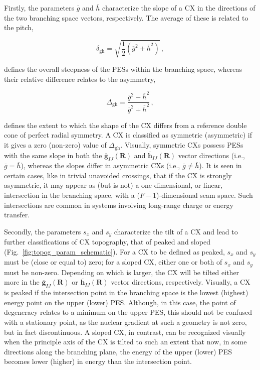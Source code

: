 \documentclass[9pt,bestpractices,pubversion]{livecoms}
\newcommand{\R}{\mathbf{R}}
\newcommand{\gua}[2]{\overline{\mathbf{g}}_{#1#2}(\R)}
\newcommand{\hua}[2]{\overline{\mathbf{h}}_{#1#2}(\R)}
\begin{document}
Firstly, the parameters $\overline{g}$ and $\overline{h}$ characterize the slope of a CX in the directions of the two branching space vectors, respectively.\cite{yarkony_nuclear_2001}
The average of these is related to the pitch,

\begin{equation}
\label{pitch}
    \delta_{\text{gh}} = \sqrt{\frac{1}{2}\left({\overline{g}}^2 + {\overline{h}}^2\right)} \, ,
\end{equation}

 defines the overall steepness of the PESs within the branching space, whereas their relative difference relates to the asymmetry,

\begin{equation}
\label{asymmetry}
    \Delta_{\text{gh}} = \frac{{\overline{g}}^2 - {\overline{h}}^2}{{\overline{g}}^2 + {\overline{h}}^2} \, ,
\end{equation}

 defines the extent to which the shape of the CX differs from a reference double cone of perfect radial symmetry.\cite{fdez_galvan_role_2022}
A CX is classified as symmetric (asymmetric) if it gives a zero (non-zero) value of $\Delta_{\text{gh}}$. Visually, symmetric CXs possess PESs with the same slope in both the $\gua{I}{J}$ and $\hua{I}{J}$ vector directions (i.e., $\overline{g} = \overline{h}$), whereas the slopes differ in asymmetric CXs (i.e., $\overline{g} \neq \overline{h}$).
It is seen in certain cases, like in trivial unavoided crossings,\cite{MEEK2015117, shchepanovska2021nonadiabatic} that if the CX is strongly asymmetric, it may appear as (but is not) a one-dimensional, or linear, intersection in the branching space, with a ($F - 1$)-dimensional seam space.\cite{boeije_one-mode_2023}
Such intersections are common in systems involving long-range charge or energy transfer.

Secondly, the parameters $s_x$ and $s_y$ characterize the tilt of a CX and lead to further classifications of CX topography, that of peaked and sloped (Fig.~\ref{fig:topog_param_schematic}).\cite{atchity_potential_1991}
For a CX to be defined as peaked, $s_x$ and $s_y$ must be (close or equal to) zero; for a sloped CX, either one or both of $s_x$ and $s_y$ must be non-zero.
Depending on which is larger, the CX will be tilted either more in the $\gua{I}{J}$ or $\hua{I}{J}$ vector directions, respectively.
Visually, a CX is peaked if the intersection point in the branching space is the lowest (highest) energy point on the upper (lower) PES. 
Although, in this case, the point of degeneracy relates to a minimum on the upper PES, this should not be confused with a stationary point, as the nuclear gradient at such a geometry is not zero, but in fact discontinuous.\cite{boeije_one-mode_2023}
A sloped CX, in contrast, can be recognized visually when the principle axis of the CX is tilted to such an extent that now, in some directions along the branching plane, the energy of the upper (lower) PES becomes lower (higher) in energy than the intersection point.\cite{doi:https://doi.org/10.1002/9781119417774.ch1}
\end{document}
